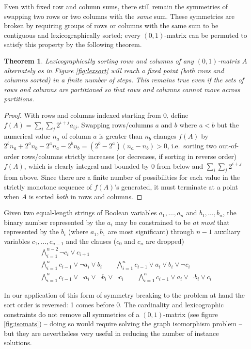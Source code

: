 \documentclass[10pt,a4paper]{article}
\newtheorem{theorem}{Theorem}[section]
\theoremstyle{definition}
\begin{document}
	Even with fixed row and column sums, there still remain the symmetries of swapping two rows or two columns with the \textit{same} sum. These symmetries are broken by requiring groups of rows or columns with the same sum to be contiguous and lexicographically sorted; every $(0,1)$-matrix can be permuted to satisfy this property by the following theorem.
	
	\begin{theorem}
		Lexicographically sorting rows and columns of any $(0,1)$-matrix $A$ alternately as in Figure \ref{fig:lexsort} will reach a fixed point (both rows and columns sorted) in a finite number of steps. This remains true even if the sets of rows and columns are partitioned so that rows and columns cannot move across partitions.
	\end{theorem}
	
	\begin{proof}
		With rows and columns indexed starting from 0, define $f(A)=\sum_i\sum_j2^{i+j}a_{ij}$. Swapping rows/columns $a$ and $b$ where $a<b$ but the numerical value $n_a$ of column $a$ is greater than $n_b$ changes $f(A)$ by $2^bn_a+2^an_b-2^an_a-2^bn_b=(2^b-2^a)(n_a-n_b)>0$, i.e.\ sorting two out-of-order rows/columns strictly increases (or decreases, if sorting in reverse order) $f(A)$, which is clearly integral and bounded by 0 from below and $\sum_i\sum_j2^{i+j}$ from above. Since there are a finite number of possibilities for each value in the strictly monotone sequence of $f(A)$'s generated, it must terminate at a point when $A$ is sorted \textit{both} in rows and columns.
	\end{proof}
	
	Given two equal-length strings of Boolean variables $a_1,\dots,a_n$ and $b_1,\dots,b_n$, the binary number represented by the $a_i$ may be constrained to be \textit{at most} that represented by the $b_i$ (where $a_1,b_1$ are most significant) through $n-1$ auxiliary variables $c_1,\dots,c_{n-1}$ and the clauses ($c_0$ and $c_n$ are dropped)
	\begin{gather*}
		\bigwedge_{i=1}^{n-2}\neg c_i\lor c_{i+1}\\
		\bigwedge_{i=1}^n c_{i-1}\lor\neg a_i\lor b_i\qquad\bigwedge_{i=1}^n c_{i-1}\lor a_i\lor b_i\lor\neg c_i\\
		\bigwedge_{i=1}^n c_{i-1}\lor\neg a_i\lor\neg b_i\lor\neg c_i\qquad\bigwedge_{i=1}^n c_{i-1}\lor a_i\lor\neg b_i\lor c_i
	\end{gather*}
	
	In our application of this form of symmetry breaking to the problem at hand the sort order is reversed: 1 comes before 0. The cardinality and lexicographic constraints do not remove all symmetries of a $(0,1)$-matrix (see figure \ref{fig:isomats}) -- doing so would require solving the graph isomorphism problem -- but they are nevertheless very useful in reducing the number of instance solutions.
	
\end{document}
